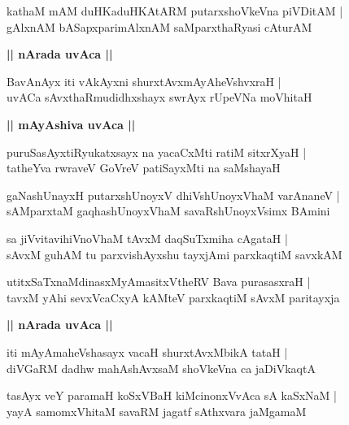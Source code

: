\documentclass[twoside,12pt,openright]{book}
\newcounter{shloka}[chapter]
\def\uvaca#1{\centerline{{\large\textbf{#1}}}}
\begin{document}
\begin{shloka}%
kathaM mAM duHKaduHKAtARM putarxshoVkeVna piVDitAM |\\
gAlxnAM bASapxparimAlxnAM saMparxthaRyasi cAturAM 
\end{shloka}

\uvaca{|| nArada uvAca ||}

\begin{shloka}%
BavAnAyx iti vAkAyxni shurxtAvxmAyAheVshvxraH |\\
uvACa sAvxthaRmudidhxshayx swrAyx rUpeVNa moVhitaH 
\end{shloka}

\uvaca{|| mAyAshiva uvAca ||}

\begin{shloka}%
puruSasAyxtiRyukatxsayx na yacaCxMti ratiM sitxrXyaH |\\
tatheYva rwraveV GoVreV patiSayxMti na saMshayaH 
\end{shloka}

\begin{shloka}%
gaNashUnayxH putarxshUnoyxV dhiVshUnoyxVhaM varAnaneV |\\
sAMparxtaM gaqhashUnoyxVhaM savaRshUnoyxVsimx BAmini 
\end{shloka}

\begin{shloka}%
sa jiVvitavihiVnoVhaM tAvxM daqSuTxmiha cAgataH |\\
sAvxM guhAM tu parxvishAyxshu tayxjAmi parxkaqtiM savxkAM 
\end{shloka}

\begin{shloka}%
utitxSaTxnaMdinasxMyAmasitxVtheRV Bava purasasxraH |\\
tavxM yAhi sevxVcaCxyA kAMteV parxkaqtiM sAvxM paritayxja 
\end{shloka}

\uvaca{|| nArada uvAca ||}

\begin{shloka}%
iti mAyAmaheVshasayx vacaH shurxtAvxMbikA tataH |\\
diVGaRM dadhw mahAshAvxsaM shoVkeVna ca jaDiVkaqtA 
\end{shloka}

\begin{shloka}%
tasAyx veY paramaH koSxVBaH kiMcinonxVvAca sA kaSxNaM |\\
yayA samomxVhitaM savaRM jagatf sAthxvara jaMgamaM
\end{shloka}
\end{document}
